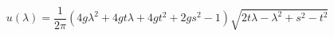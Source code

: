 \begin{equation}
     u(\lambda)=\frac{1}{2\pi}\left(4g\lambda^2+4gt\lambda+4gt^2+2gs^2-1\right)
    \sqrt{2t\lambda-\lambda^2+s^2-t^2}
\end{equation}


